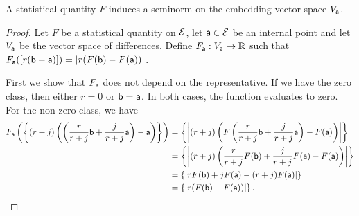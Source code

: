 \begin{mathSection}
\begin{prop}
	A statistical quantity $F$ induces a seminorm on the embedding vector space $V_{\ens[a]}$.
\end{prop}

\begin{proof}
	Let $F$ be a statistical quantity on $\Ens$, let $\ens[a] \in \Ens$ be an internal point and let $V_{\ens[a]}$ be the vector space of differences. Define $F_{\ens[a]} : V_{\ens[a]} \to \mathbb{R}$ such that $F_{\ens[a]}([r(\ens[b]-\ens[a])]) = |r (F(\ens[b]) - F(\ens[a]))|$.
	
	First we show that $F_{\ens[a]}$ does not depend on the representative. If we have the zero class, then either $r=0$ or $\ens[b] = \ens[a]$. In both cases, the function evaluates to zero. For the non-zero class, we have
	\begin{equation}
		\begin{aligned}
			F_{\ens[a]}\left(\left\{(r+j)\left(\left(\frac{r}{r+j}\ens[b] +\frac{j}{r+j} \ens[a]\right) -\ens[a]\right)\right\}\right) &= \left\{ \left|(r+j)\left(F\left(\frac{r}{r+j}\ens[b] +\frac{j}{r+j} \ens[a]\right) - F(\ens[a]) \right)\right| \right\} \\
			&= \left\{ \left|(r+j)\left(\frac{r}{r+j}F(\ens[b]) +\frac{j}{r+j} F(\ens[a]) - F(\ens[a]) \right)\right| \right\} \\
			&= \left\{ \left| r F(\ens[b]) + j F(\ens[a]) - (r+j) F(\ens[a]) \right| \right\} \\
			&= \left\{|r (F(\ens[b]) - F(\ens[a]))|\right\}.
		\end{aligned}
	\end{equation}
	

\end{proof}
\end{mathSection}
